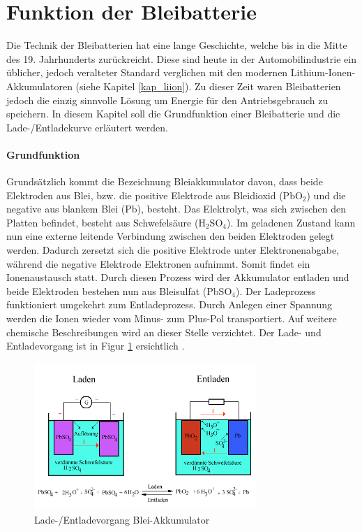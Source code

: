 \section{Funktion der Bleibatterie}

Die Technik der Bleibatterien hat eine lange Geschichte, welche bis in die Mitte des 19. Jahrhunderts zurückreicht. Diese sind heute in der Automobilindustrie ein üblicher, jedoch veralteter Standard verglichen mit den modernen Lithium-Ionen-Akkumulatoren (siehe Kapitel \ref{kap_liion}). Zu dieser Zeit waren Bleibatterien jedoch die einzig sinnvolle Lösung um Energie für den Antriebsgebrauch zu speichern. In diesem Kapitel soll die Grundfunktion einer Bleibatterie und die Lade-/Entladekurve erläutert werden.

\paragraph{Grundfunktion}
Grundsätzlich kommt die Bezeichnung Bleiakkumulator davon, dass beide Elektroden aus Blei, bzw. die positive Elektrode aus Bleidioxid (PbO$_2$) und die negative aus blankem Blei (Pb), besteht. Das Elektrolyt, was sich zwischen den Platten befindet, besteht aus Schwefelsäure (H$_2$SO$_4$). Im geladenen Zustand kann nun eine externe leitende Verbindung zwischen den beiden Elektroden gelegt werden. Dadurch zersetzt sich die positive Elektrode unter Elektronenabgabe, während die negative Elektrode Elektronen aufnimmt. Somit findet ein Ionenaustausch statt. Durch diesen Prozess wird der Akkumulator entladen und beide Elektroden bestehen nun aus Bleisulfat (PbSO$_4$). Der Ladeprozess funktioniert umgekehrt zum Entladeprozess. Durch Anlegen einer Spannung werden die Ionen wieder vom Minus- zum Plus-Pol transportiert. Auf weitere chemische Beschreibungen wird an dieser Stelle verzichtet. Der Lade- und Entladevorgang ist in Figur \ref{fig:pb_akku} ersichtlich \cite{pb_akku_funktion1} \cite{pb_akku_funktion2}.

\begin{figure}[h!]
	\centering
		\includegraphics[width=0.75\textwidth]{images/pb_akku.PNG}
	\caption{Lade-/Entladevorgang Blei-Akkumulator \cite{pb_akku_ent_lade}}
	\label{fig:pb_akku}
\end{figure}

